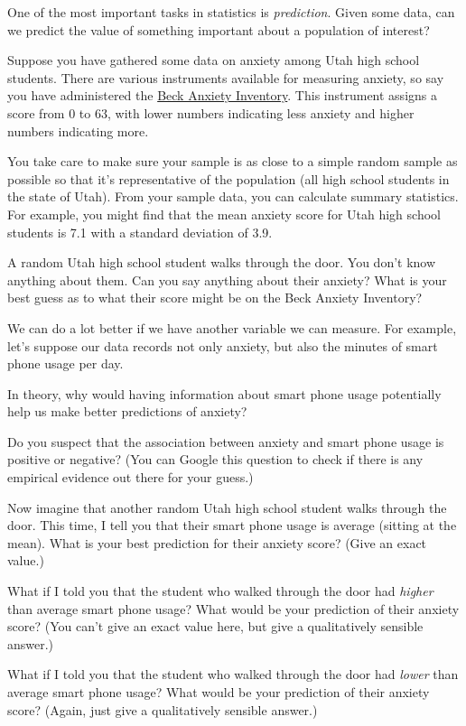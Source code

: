 \documentclass[
]{book}
\begin{document}
One of the most important tasks in statistics is \emph{prediction}. Given some data, can we predict the value of something important about a population of interest?

Suppose you have gathered some data on anxiety among Utah high school students. There are various instruments available for measuring anxiety, so say you have administered the \href{https://en.wikipedia.org/wiki/Beck_Anxiety_Inventory}{Beck Anxiety Inventory}. This instrument assigns a score from 0 to 63, with lower numbers indicating less anxiety and higher numbers indicating more.

You take care to make sure your sample is as close to a simple random sample as possible so that it's representative of the population (all high school students in the state of Utah). From your sample data, you can calculate summary statistics. For example, you might find that the mean anxiety score for Utah high school students is 7.1 with a standard deviation of 3.9.

A random Utah high school student walks through the door. You don't know anything about them. Can you say anything about their anxiety? What is your best guess as to what their score might be on the Beck Anxiety Inventory?

We can do a lot better if we have another variable we can measure. For example, let's suppose our data records not only anxiety, but also the minutes of smart phone usage per day.

In theory, why would having information about smart phone usage potentially help us make better predictions of anxiety?

Do you suspect that the association between anxiety and smart phone usage is positive or negative? (You can Google this question to check if there is any empirical evidence out there for your guess.)

Now imagine that another random Utah high school student walks through the door. This time, I tell you that their smart phone usage is average (sitting at the mean). What is your best prediction for their anxiety score? (Give an exact value.)

What if I told you that the student who walked through the door had \emph{higher} than average smart phone usage? What would be your prediction of their anxiety score? (You can't give an exact value here, but give a qualitatively sensible answer.)

What if I told you that the student who walked through the door had \emph{lower} than average smart phone usage? What would be your prediction of their anxiety score? (Again, just give a qualitatively sensible answer.)
\end{document}
